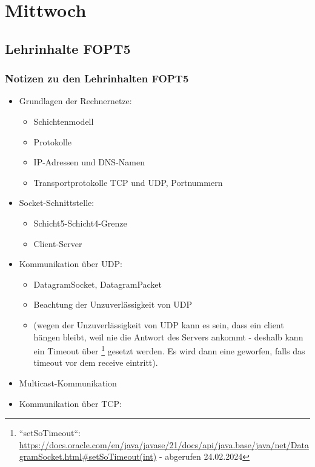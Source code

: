 \section{Mittwoch}

\subsection{Lehrinhalte FOPT5}

\subsubsection{Notizen zu den Lehrinhalten FOPT5}

\begin{itemize}
    \item Grundlagen der Rechnernetze:
    \begin{itemize}
        \item Schichtenmodell
        \item Protokolle
        \item IP-Adressen und DNS-Namen
        \item Transportprotokolle TCP und UDP, Portnummern
    \end{itemize}
    \item Socket-Schnittstelle:
    \begin{itemize}
        \item Schicht5-Schicht4-Grenze
        \item Client-Server
    \end{itemize}
    \item Kommunikation über UDP:
    \begin{itemize}
        \item DatagramSocket, DatagramPacket
        \item Beachtung der Unzuverlässigkeit von UDP
        \item[] (wegen der Unzuverlässigkeit von UDP kann es sein, dass ein client hängen bleibt, weil nie die Antwort des Servers ankommt - deshalb kann ein Timeout über \footnote{
        ``setSoTimeout``: \url{https://docs.oracle.com/en/java/javase/21/docs/api/java.base/java/net/DatagramSocket.html#setSoTimeout(int)} - abgerufen 24.02.2024
        } gesetzt werden. Es wird dann eine  geworfen, falls das timeout vor dem receive eintritt).
    \end{itemize}
    \item Multicast-Kommunikation
    \item Kommunikation über TCP:

\end{itemize}
